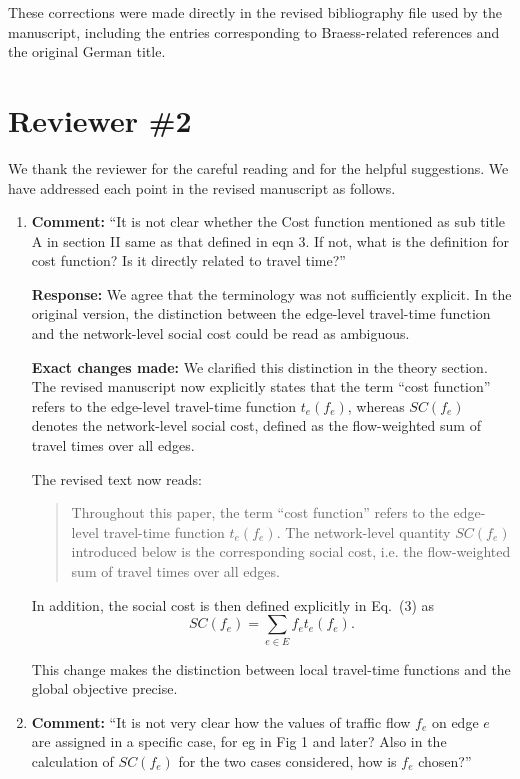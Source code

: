 \documentclass[11pt]{article}
\begin{document}
\begin{enumerate}
These corrections were made directly in the revised bibliography file used by the manuscript, including the entries corresponding to Braess-related references and the original German title.
\end{enumerate}

\section*{Reviewer \#2}

We thank the reviewer for the careful reading and for the helpful suggestions. We have addressed each point in the revised manuscript as follows.

\begin{enumerate}
\item \textbf{Comment:} ``It is not clear whether the Cost function mentioned as sub title A in section II same as that defined in eqn 3. If not, what is the definition for cost function? Is it directly related to travel time?''

\textbf{Response:} We agree that the terminology was not sufficiently explicit. In the original version, the distinction between the edge-level travel-time function and the network-level social cost could be read as ambiguous.

\textbf{Exact changes made:} We clarified this distinction in the theory section. The revised manuscript now explicitly states that the term ``cost function'' refers to the edge-level travel-time function $t_e(f_e)$, whereas $SC(f_e)$ denotes the network-level social cost, defined as the flow-weighted sum of travel times over all edges.

The revised text now reads:

\begin{quote}
Throughout this paper, the term ``cost function'' refers to the edge-level travel-time function $t_e(f_e)$. The network-level quantity $SC(f_e)$ introduced below is the corresponding social cost, i.e. the flow-weighted sum of travel times over all edges.
\end{quote}

In addition, the social cost is then defined explicitly in Eq.~(3) as
\[
SC(f_e) = \sum_{e \in E} f_e t_e(f_e).
\]

This change makes the distinction between local travel-time functions and the global objective precise.

\item \textbf{Comment:} ``It is not very clear how the values of traffic flow $f_e$ on edge $e$ are assigned in a specific case, for eg in Fig 1 and later? Also in the calculation of $SC(f_e)$ for the two cases considered, how is $f_e$ chosen?''


\end{enumerate}
\end{document}
